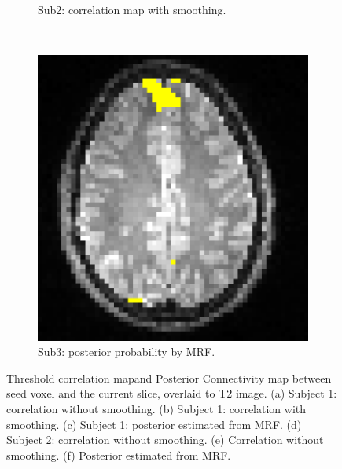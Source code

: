 \begin{figure}[p]
\begin{subfigure}[t]{0.3\textwidth}
    \caption{Sub2: correlation map with smoothing. }
    \label{fig:invivo15}
    \end{subfigure}
~
  \begin{subfigure}[t]{0.3\textwidth}
    \centering
    \includegraphics[width=\textwidth]{figures/method1/invivo1/r2_mrf}
    \caption{Sub3: posterior probability by MRF.}
    \label{fig:invivo16}
    \end{subfigure}
    \caption{ Threshold correlation mapand Posterior Connectivity map between
      seed voxel and the current slice, overlaid to T2 image.  (a) Subject 1:
      correlation without smoothing. (b) Subject 1: correlation with
      smoothing. (c) Subject 1: posterior estimated from MRF. (d) Subject 2:
      correlation without smoothing. (e) Correlation without smoothing. (f)
      Posterior estimated from MRF. }
  \label{fig:invivo1}
\end{figure}


